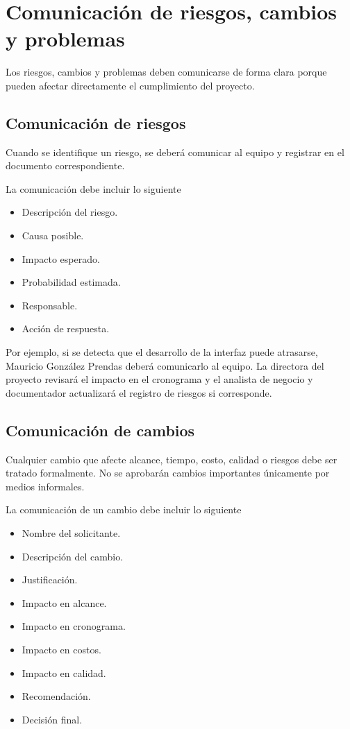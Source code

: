 \documentclass[11pt,spanish]{article}
\begin{document}
\section{Comunicación de riesgos, cambios y problemas}

Los riesgos, cambios y problemas deben comunicarse de forma clara porque pueden afectar directamente el cumplimiento del proyecto.

\subsection{Comunicación de riesgos}

Cuando se identifique un riesgo, se deberá comunicar al equipo y registrar en el documento correspondiente.

La comunicación debe incluir lo siguiente

\begin{itemize}
    \item Descripción del riesgo.
    \item Causa posible.
    \item Impacto esperado.
    \item Probabilidad estimada.
    \item Responsable.
    \item Acción de respuesta.
\end{itemize}

Por ejemplo, si se detecta que el desarrollo de la interfaz puede atrasarse, Mauricio González Prendas deberá comunicarlo al equipo. La directora del proyecto revisará el impacto en el cronograma y el analista de negocio y documentador actualizará el registro de riesgos si corresponde.

\subsection{Comunicación de cambios}

Cualquier cambio que afecte alcance, tiempo, costo, calidad o riesgos debe ser tratado formalmente. No se aprobarán cambios importantes únicamente por medios informales.

La comunicación de un cambio debe incluir lo siguiente

\begin{itemize}
    \item Nombre del solicitante.
    \item Descripción del cambio.
    \item Justificación.
    \item Impacto en alcance.
    \item Impacto en cronograma.
    \item Impacto en costos.
    \item Impacto en calidad.
    \item Recomendación.
    \item Decisión final.
\end{itemize}
\end{document}
